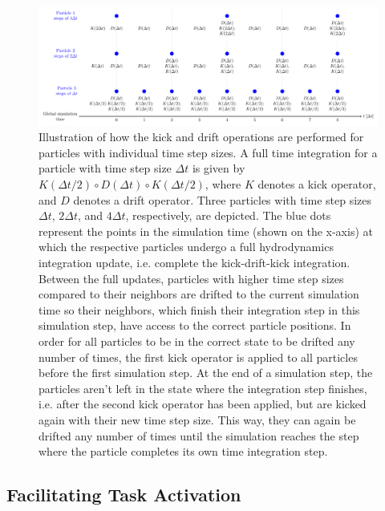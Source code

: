 \begin{figure}
 \centering
 \includegraphics[width=\textwidth]{figures/Meshless/individual_timestepping_operators.pdf}%
 \caption{
Illustration of how the kick and drift operations are performed for particles with individual time
step sizes. A full time integration for a particle with time step size $\Delta t$ is given by
$K(\Delta t / 2) \circ D(\Delta t) \circ K(\Delta t/2)$, where $K$ denotes a kick operator, and $D$
denotes a drift operator. Three particles with time step sizes $\Delta t$, $2 \Delta t$, and $4
\Delta t$, respectively, are depicted. The blue dots represent the points in the simulation time
(shown on the x-axis) at which the respective particles undergo a full hydrodynamics integration
update, i.e. complete the kick-drift-kick integration. Between the full updates, particles with
higher time step sizes compared to their neighbors are drifted to the current simulation time so
their neighbors, which finish their integration step in this simulation step, have access to the
correct particle positions. In order for all particles to be in the correct state to be drifted any
number of times, the first kick operator is applied to all particles before the first simulation
step. At the end of a simulation step, the particles aren't left in the state where the integration
step finishes, i.e. after the second kick operator has been applied, but are kicked again with their
new time step size. This way, they can again be drifted any number of times until the simulation
reaches the step where the particle completes its own time integration step.
 }
 \label{fig:individual-time-steps-drifts}
\end{figure}






\subsection{Facilitating Task Activation}

